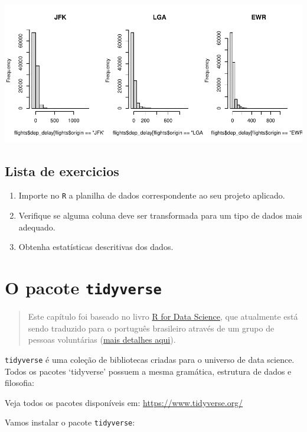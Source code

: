 \documentclass[
]{book}
\begin{document}
\includegraphics[width=1\linewidth]{AprendendoR_files/figure-latex/unnamed-chunk-28-1}

\section{Lista de exercicios}\label{lista-de-exercicios-1}

\begin{enumerate}
\def\labelenumi{\arabic{enumi}.}
\item
  Importe no \texttt{R} a planilha de dados correspondente ao seu projeto aplicado.
\item
  Verifique se alguma coluna deve ser transformada para um tipo de dados mais adequado.
\item
  Obtenha estatísticas descritivas dos dados.
\end{enumerate}

\chapter{\texorpdfstring{O pacote \texttt{tidyverse}}{O pacote tidyverse}}\label{o-pacote-tidyverse}

\begin{quote}
Este capítulo foi baseado no livro \href{https://r4ds.had.co.nz/}{R for Data Science}, que atualmente está sendo traduzido para o português brasileiro através de um grupo de pessoas voluntárias (\href{https://github.com/orgs/cienciadedatos/projects/2}{mais detalhes aqui}).
\end{quote}

\texttt{tidyverse} é uma coleção de bibliotecas criadas para o universo de data science.
Todos os pacotes `tidyverse' possuem a mesma gramática, estrutura de dados e filosofia:

Veja todos os pacotes disponíveis em: \url{https://www.tidyverse.org/}

Vamos instalar o pacote \texttt{tidyverse}:
\end{document}
